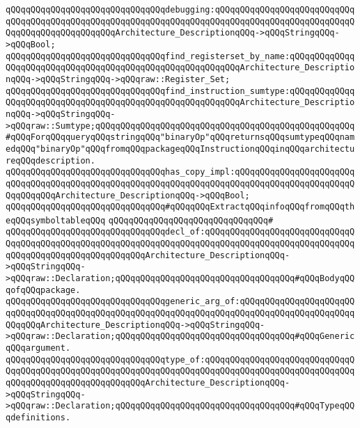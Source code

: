 \verb|qQQqqQQqqQQqqQQqqQQqqQQqqQQqqQQqdebugging:qQQqqQQqqQQqqQQqqQQqqQQqqQQqqQQqqQQqqQQqqQQqqQQqqQQqqQQqqQQqqQQqqQQqqQQqqQQqqQQqqQQqqQQqqQQqqQQqqQQqqQQqqQQqqQQqqQQqqQQqArchitecture_DescriptionqQQq->qQQqStringqQQq->qQQqBool;|\newline
\verb|qQQqqQQqqQQqqQQqqQQqqQQqqQQqqQQqfind_registerset_by_name:qQQqqQQqqQQqqQQqqQQqqQQqqQQqqQQqqQQqqQQqqQQqqQQqqQQqqQQqqQQqArchitecture_DescriptionqQQq->qQQqStringqQQq->qQQqraw::Register_Set;|\newline
\verb|qQQqqQQqqQQqqQQqqQQqqQQqqQQqqQQqfind_instruction_sumtype:qQQqqQQqqQQqqQQqqQQqqQQqqQQqqQQqqQQqqQQqqQQqqQQqqQQqqQQqqQQqArchitecture_DescriptionqQQq->qQQqStringqQQq->qQQqraw::Sumtype;qQQqqQQqqQQqqQQqqQQqqQQqqQQqqQQqqQQqqQQqqQQqqQQqqQQq#qQQqForqQQqqueryqQQqstringqQQq"binaryOp"qQQqreturnsqQQqsumtypeqQQqnamedqQQq"binaryOp"qQQqfromqQQqpackageqQQqInstructionqQQqinqQQqarchitectureqQQqdescription.|\newline
\verb|qQQqqQQqqQQqqQQqqQQqqQQqqQQqqQQqhas_copy_impl:qQQqqQQqqQQqqQQqqQQqqQQqqQQqqQQqqQQqqQQqqQQqqQQqqQQqqQQqqQQqqQQqqQQqqQQqqQQqqQQqqQQqqQQqqQQqqQQqqQQqqQQqArchitecture_DescriptionqQQq->qQQqBool;|\newline
\newline
\newline
\newline
\verb|qQQqqQQqqQQqqQQqqQQqqQQqqQQqqQQq#qQQqqQQqExtractqQQqinfoqQQqfromqQQqtheqQQqsymboltableqQQq|\newline
\verb|qQQqqQQqqQQqqQQqqQQqqQQqqQQqqQQq#|\newline
\verb|qQQqqQQqqQQqqQQqqQQqqQQqqQQqqQQqdecl_of:qQQqqQQqqQQqqQQqqQQqqQQqqQQqqQQqqQQqqQQqqQQqqQQqqQQqqQQqqQQqqQQqqQQqqQQqqQQqqQQqqQQqqQQqqQQqqQQqqQQqqQQqqQQqqQQqqQQqqQQqqQQqqQQqArchitecture_DescriptionqQQq->qQQqStringqQQq->qQQqraw::Declaration;qQQqqQQqqQQqqQQqqQQqqQQqqQQqqQQqqQQq#qQQqBodyqQQqofqQQqpackage.|\newline
\verb|qQQqqQQqqQQqqQQqqQQqqQQqqQQqqQQqgeneric_arg_of:qQQqqQQqqQQqqQQqqQQqqQQqqQQqqQQqqQQqqQQqqQQqqQQqqQQqqQQqqQQqqQQqqQQqqQQqqQQqqQQqqQQqqQQqqQQqqQQqqQQqArchitecture_DescriptionqQQq->qQQqStringqQQq->qQQqraw::Declaration;qQQqqQQqqQQqqQQqqQQqqQQqqQQqqQQqqQQq#qQQqGenericqQQqargument.|\newline
\verb|qQQqqQQqqQQqqQQqqQQqqQQqqQQqqQQqtype_of:qQQqqQQqqQQqqQQqqQQqqQQqqQQqqQQqqQQqqQQqqQQqqQQqqQQqqQQqqQQqqQQqqQQqqQQqqQQqqQQqqQQqqQQqqQQqqQQqqQQqqQQqqQQqqQQqqQQqqQQqqQQqqQQqArchitecture_DescriptionqQQq->qQQqStringqQQq->qQQqraw::Declaration;qQQqqQQqqQQqqQQqqQQqqQQqqQQqqQQqqQQq#qQQqTypeqQQqdefinitions.|\newline
